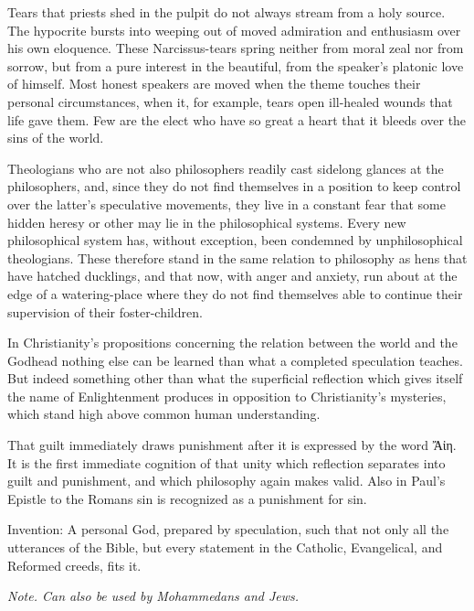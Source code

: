 \documentclass[12pt,a4paper]{article}
\newcommand{\opage}[1]{\marginnote{\footnotesize\textit{[#1]}}}
\newcommand{\aphsep}{\par\smallskip\centerline{\textasteriskcentered}\smallskip}
\begin{document}
\aphsep

Tears that priests shed in the pulpit do not always stream from a holy source.
The hypocrite bursts into weeping out of moved admiration and enthusiasm over his
own eloquence. These Narcissus-tears spring neither from moral zeal nor from
sorrow, but from a pure interest in the beautiful, from the speaker's platonic
love of himself. Most honest speakers are moved when the theme touches their
personal circumstances, when it, for example, tears open ill-healed wounds that
life gave them. Few are the elect who have so great a heart that it bleeds over
the sins of the world.

\aphsep

Theologians who are not also philosophers readily cast sidelong glances at the
philosophers, and, since they do not find themselves in a position to keep
control over the latter's speculative movements, they live in a constant fear
that some hidden heresy or other may lie in the philosophical systems. Every new
philosophical system has, without exception, been condemned by unphilosophical
theologians. These therefore stand in the same relation to philosophy as hens
that have hatched ducklings, and that now, with anger and anxiety, run about at
the edge of a watering-place where they do not find themselves able to continue
their supervision of their foster-children.

\aphsep

In Christianity's propositions concerning the relation between the world and the
Godhead nothing else can be learned than what a completed \opage{34}speculation
teaches. But indeed something other than what the superficial reflection which
gives itself the name of Enlightenment produces in opposition to Christianity's
mysteries, which stand high above common human understanding.

\aphsep

That guilt immediately draws punishment after it is expressed by the word Ἄἰη. It
is the first immediate cognition of that unity which reflection separates into
guilt and punishment, and which philosophy again makes valid. Also in Paul's
Epistle to the Romans sin is recognized as a punishment for sin.

\aphsep

Invention: A personal God, prepared by speculation, such that not only all the
utterances of the Bible, but every statement in the Catholic, Evangelical, and
Reformed creeds, fits it.

\emph{Note. Can also be used by Mohammedans and Jews.}
\end{document}
